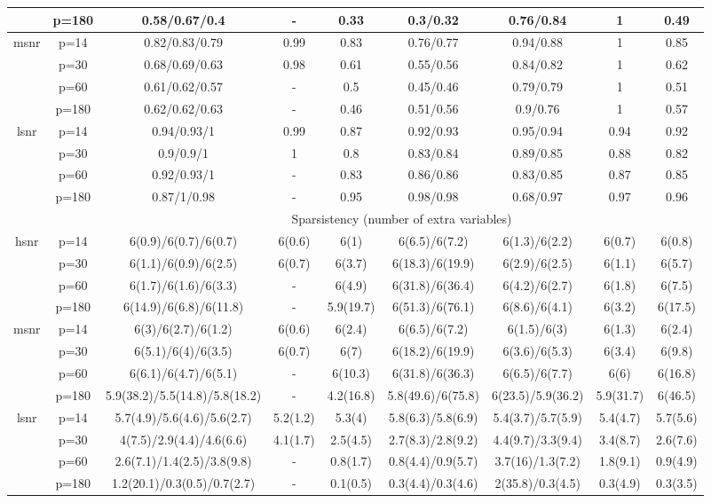 \begin{table}[ht]
{\begin{tabular}{|c|c|ccccccc|}
   & p=180 & 0.58/0.67/0.4 & - & 0.33 & 0.3/0.32 & 0.76/0.84 & 1 & 0.49 \\ 
  \midrule\multirow{4}[2]{*}{msnr} & p=14 & 0.82/0.83/0.79 & 0.99 & 0.83 & 0.76/0.77 & 0.94/0.88 & 1 & 0.85 \\ 
   & p=30 & 0.68/0.69/0.63 & 0.98 & 0.61 & 0.55/0.56 & 0.84/0.82 & 1 & 0.62 \\ 
   & p=60 & 0.61/0.62/0.57 & - & 0.5 & 0.45/0.46 & 0.79/0.79 & 1 & 0.51 \\ 
   & p=180 & 0.62/0.62/0.63 & - & 0.46 & 0.51/0.56 & 0.9/0.76 & 1 & 0.57 \\ 
  \midrule\multirow{4}[2]{*}{lsnr} & p=14 & 0.94/0.93/1 & 0.99 & 0.87 & 0.92/0.93 & 0.95/0.94 & 0.94 & 0.92 \\ 
   & p=30 & 0.9/0.9/1 & 1 & 0.8 & 0.83/0.84 & 0.89/0.85 & 0.88 & 0.82 \\ 
   & p=60 & 0.92/0.93/1 & - & 0.83 & 0.86/0.86 & 0.83/0.85 & 0.87 & 0.85 \\ 
   & p=180 & 0.87/1/0.98 & - & 0.95 & 0.98/0.98 & 0.68/0.97 & 0.97 & 0.96 \\ 
   \midrule 
 \multicolumn{1}{|c}{} &       & \multicolumn{7}{c|}{Sparsistency (number of extra variables)} \\
\midrule\multirow{4}[2]{*}{hsnr} & p=14 & 6(0.9)/6(0.7)/6(0.7) & 6(0.6) & 6(1) & 6(6.5)/6(7.2) & 6(1.3)/6(2.2) & 6(0.7) & 6(0.8) \\ 
   & p=30 & 6(1.1)/6(0.9)/6(2.5) & 6(0.7) & 6(3.7) & 6(18.3)/6(19.9) & 6(2.9)/6(2.5) & 6(1.1) & 6(5.7) \\ 
   & p=60 & 6(1.7)/6(1.6)/6(3.3) & - & 6(4.9) & 6(31.8)/6(36.4) & 6(4.2)/6(2.7) & 6(1.8) & 6(7.5) \\ 
   & p=180 & 6(14.9)/6(6.8)/6(11.8) & - & 5.9(19.7) & 6(51.3)/6(76.1) & 6(8.6)/6(4.1) & 6(3.2) & 6(17.5) \\ 
  \midrule\multirow{4}[2]{*}{msnr} & p=14 & 6(3)/6(2.7)/6(1.2) & 6(0.6) & 6(2.4) & 6(6.5)/6(7.2) & 6(1.5)/6(3) & 6(1.3) & 6(2.4) \\ 
   & p=30 & 6(5.1)/6(4)/6(3.5) & 6(0.7) & 6(7) & 6(18.2)/6(19.9) & 6(3.6)/6(5.3) & 6(3.4) & 6(9.8) \\ 
   & p=60 & 6(6.1)/6(4.7)/6(5.1) & - & 6(10.3) & 6(31.8)/6(36.3) & 6(6.5)/6(7.7) & 6(6) & 6(16.8) \\ 
   & p=180 & 5.9(38.2)/5.5(14.8)/5.8(18.2) & - & 4.2(16.8) & 5.8(49.6)/6(75.8) & 6(23.5)/5.9(36.2) & 5.9(31.7) & 6(46.5) \\ 
  \midrule\multirow{4}[2]{*}{lsnr} & p=14 & 5.7(4.9)/5.6(4.6)/5.6(2.7) & 5.2(1.2) & 5.3(4) & 5.8(6.3)/5.8(6.9) & 5.4(3.7)/5.7(5.9) & 5.4(4.7) & 5.7(5.6) \\ 
   & p=30 & 4(7.5)/2.9(4.4)/4.6(6.6) & 4.1(1.7) & 2.5(4.5) & 2.7(8.3)/2.8(9.2) & 4.4(9.7)/3.3(9.4) & 3.4(8.7) & 2.6(7.6) \\ 
   & p=60 & 2.6(7.1)/1.4(2.5)/3.8(9.8) & - & 0.8(1.7) & 0.8(4.4)/0.9(5.7) & 3.7(16)/1.3(7.2) & 1.8(9.1) & 0.9(4.9) \\ 
   & p=180 & 1.2(20.1)/0.3(0.5)/0.7(2.7) & - & 0.1(0.5) & 0.3(4.4)/0.3(4.6) & 2(35.8)/0.3(4.5) & 0.3(4.9) & 0.3(3.5) \\ 
   \bottomrule 
\end{tabular}
}
\end{table}
